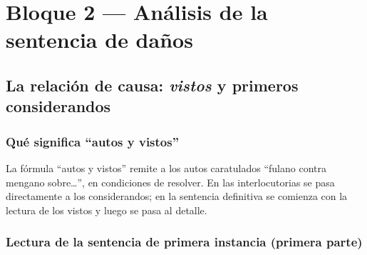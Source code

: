 \documentclass[12pt,oneside]{book}
\begin{document}
\chapter[An\'alisis de la sentencia de da\~nos]{Bloque 2 --- An\'alisis de la sentencia de da\~nos}

\section{La relaci\'on de causa: \emph{vistos} y primeros considerandos}

\subsection{Qu\'e significa ``autos y vistos''}

La f\'ormula ``autos y vistos'' remite a los autos caratulados ``fulano contra mengano sobre\ldots'', en condiciones de resolver. En las interlocutorias se pasa directamente a los considerandos; en la sentencia definitiva se comienza con la lectura de los vistos y luego se pasa al detalle.

\subsection{Lectura de la sentencia de primera instancia (primera parte)}
\end{document}
